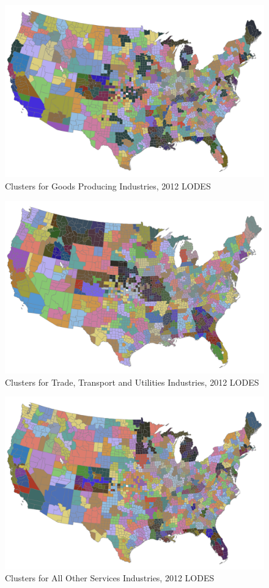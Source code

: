 

\begin{figure}
\caption{Clusters for Goods Producing Industries, 2012 LODES \label{fig:mapgoods}}
\includegraphics[scale=.5]{./figures/lodes_2012_ind1.png}
\end{figure}

\begin{figure}
\caption{Clusters for Trade, Transport and Utilities Industries, 2012 LODES \label{fig:maptransport}}
\includegraphics[scale=.5]{./figures/lodes_2012_ind2.png}
\end{figure}

\begin{figure}
\caption{Clusters for All Other Services Industries, 2012 LODES \label{fig:mapservices}}
\includegraphics[scale=.5]{./figures/lodes_2012_ind3.png}
\end{figure}

